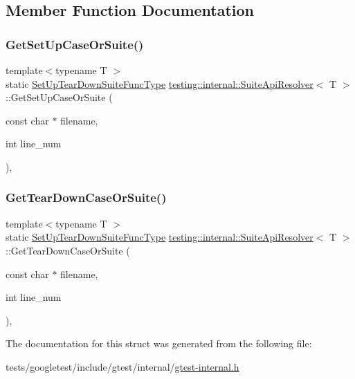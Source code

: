 \subsection{Member Function Documentation}
\mbox{\label{structtesting_1_1internal_1_1SuiteApiResolver_abae647b1fed9422fc596fd385de6dd5b}} 
\subsubsection{\texorpdfstring{Get\+Set\+Up\+Case\+Or\+Suite()}{GetSetUpCaseOrSuite()}}
{\footnotesize\ttfamily template$<$typename T $>$ \\
static \hyperlink{namespacetesting_1_1internal_a04786aa10f8b0bf38a5ead94d00475f4}{Set\+Up\+Tear\+Down\+Suite\+Func\+Type} \hyperlink{structtesting_1_1internal_1_1SuiteApiResolver}{testing\+::internal\+::\+Suite\+Api\+Resolver}$<$ T $>$\+::Get\+Set\+Up\+Case\+Or\+Suite (\begin{DoxyParamCaption}\item[{const char $\ast$}]{filename,  }\item[{int}]{line\+\_\+num }\end{DoxyParamCaption})\hspace{0.3cm}{\ttfamily [inline]}, {\ttfamily [static]}}

\mbox{\label{structtesting_1_1internal_1_1SuiteApiResolver_a60e647dc7974c2e834812c491cbbca25}} 
\subsubsection{\texorpdfstring{Get\+Tear\+Down\+Case\+Or\+Suite()}{GetTearDownCaseOrSuite()}}
{\footnotesize\ttfamily template$<$typename T $>$ \\
static \hyperlink{namespacetesting_1_1internal_a04786aa10f8b0bf38a5ead94d00475f4}{Set\+Up\+Tear\+Down\+Suite\+Func\+Type} \hyperlink{structtesting_1_1internal_1_1SuiteApiResolver}{testing\+::internal\+::\+Suite\+Api\+Resolver}$<$ T $>$\+::Get\+Tear\+Down\+Case\+Or\+Suite (\begin{DoxyParamCaption}\item[{const char $\ast$}]{filename,  }\item[{int}]{line\+\_\+num }\end{DoxyParamCaption})\hspace{0.3cm}{\ttfamily [inline]}, {\ttfamily [static]}}



The documentation for this struct was generated from the following file\+:\begin{DoxyCompactItemize}
\item 
tests/googletest/include/gtest/internal/\hyperlink{gtest-internal_8h}{gtest-\/internal.\+h}\end{DoxyCompactItemize}
